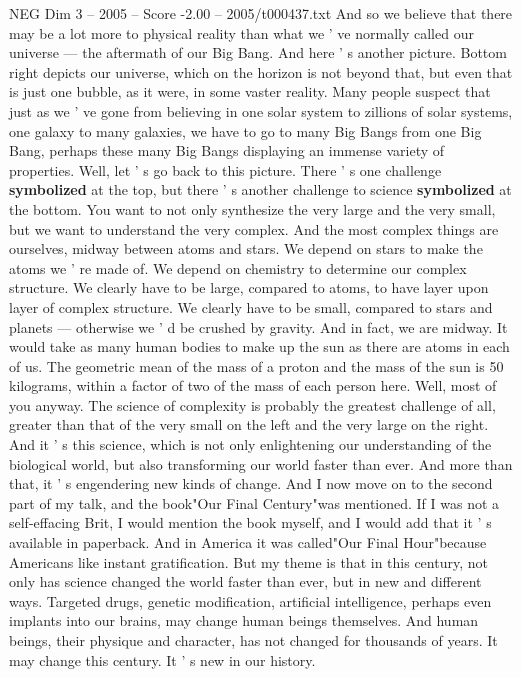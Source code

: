 \begin{textsample}{NEG Dim 3 – 2005 – Score -2.00 – 2005/t000437.txt}
And so we believe that there may be a lot more to physical reality than what we ' ve normally called our universe — the aftermath of our Big Bang.
And here ' s another picture.
Bottom right depicts our universe, which on the horizon is not beyond that, but even that is just one bubble, as it were, in some vaster reality.
Many people suspect that just as we ' ve gone from believing in one solar system to zillions of solar systems, one galaxy to many galaxies, we have to go to many Big Bangs from one Big Bang, perhaps these many Big Bangs displaying an immense variety of properties.
Well, let ' s go back to this picture.
There ' s one challenge \textbf{symbolized} at the top, but there ' s another challenge to science \textbf{symbolized} at the bottom.
You want to not only synthesize the very large and the very small, but we want to understand the very complex.
And the most complex things are ourselves, midway between atoms and stars.
We depend on stars to make the atoms we ' re made of.
We depend on chemistry to determine our complex structure.
We clearly have to be large, compared to atoms, to have layer upon layer of complex structure.
We clearly have to be small, compared to stars and planets — otherwise we ' d be crushed by gravity.
And in fact, we are midway.
It would take as many human bodies to make up the sun as there are atoms in each of us.
The geometric mean of the mass of a proton and the mass of the sun is 50 kilograms, within a factor of two of the mass of each person here.
Well, most of you anyway.
The science of complexity is probably the greatest challenge of all, greater than that of the very small on the left and the very large on the right.
And it ' s this science, which is not only enlightening our understanding of the biological world, but also transforming our world faster than ever.
And more than that, it ' s engendering new kinds of change.
And I now move on to the second part of my talk, and the book"Our Final Century"was mentioned.
If I was not a self-effacing Brit, I would mention the book myself, and I would add that it ' s available in paperback.
And in America it was called"Our Final Hour"because Americans like instant gratification.
But my theme is that in this century, not only has science changed the world faster than ever, but in new and different ways.
Targeted drugs, genetic modification, artificial intelligence, perhaps even implants into our brains, may change human beings themselves.
And human beings, their physique and character, has not changed for thousands of years.
It may change this century.
It ' s new in our history.

\end{textsample}
